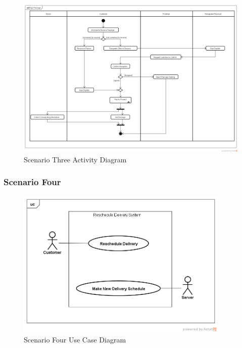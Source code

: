 \documentclass[12pt]{scrreprt}
\begin{document}
\begin{figure}[H]
  \centering\includegraphics[width=5.5in]{DocumentRes/3SignPackage.png}
  \caption{Scenario Three Activity Diagram}
\end{figure}

\subsubsection{Scenario Four}
\begin{figure}[H]
  \centering\includegraphics[width=4in]{DocumentRes/4UseCaseDiagram.png}
  \caption{Scenario Four Use Case Diagram}
\end{figure}
\end{document}
